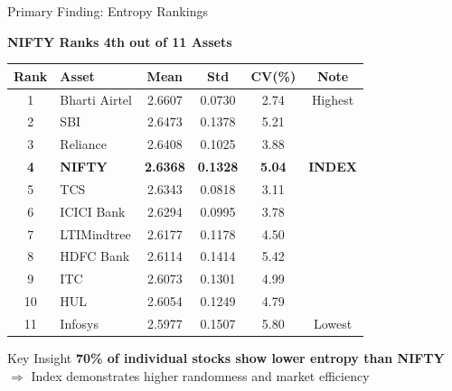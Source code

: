 \documentclass[aspectratio=169,12pt,xcolor=table]{beamer}
\begin{document}
\begin{frame}{Primary Finding: Entropy Rankings}
\begin{center}
\textbf{\Large NIFTY Ranks 4th out of 11 Assets}
\end{center}

\vspace{0.1cm}
\begin{table}[h]
\centering
\small
\begin{tabular}{clcccc}
\toprule
\textbf{Rank} & \textbf{Asset} & \textbf{Mean} & \textbf{Std} & \textbf{CV(\%)} & \textbf{Note} \\
\midrule
1 & Bharti Airtel & 2.6607 & 0.0730 & 2.74 & Highest \\
2 & SBI & 2.6473 & 0.1378 & 5.21 & \\
3 & Reliance & 2.6408 & 0.1025 & 3.88 & \\
\rowcolor{niftyblue!30} \textbf{4} & \textbf{NIFTY} & \textbf{2.6368} & \textbf{0.1328} & \textbf{5.04} & \textbf{INDEX} \\
5 & TCS & 2.6343 & 0.0818 & 3.11 & \\
6 & ICICI Bank & 2.6294 & 0.0995 & 3.78 & \\
7 & LTIMindtree & 2.6177 & 0.1178 & 4.50 & \\
8 & HDFC Bank & 2.6114 & 0.1414 & 5.42 & \\
9 & ITC & 2.6073 & 0.1301 & 4.99 & \\
10 & HUL & 2.6054 & 0.1249 & 4.79 & \\
11 & Infosys & 2.5977 & 0.1507 & 5.80 & Lowest \\
\bottomrule
\end{tabular}
\end{table}

\begin{block}{Key Insight}
\textcolor{niftyblue}{\textbf{70\% of individual stocks show lower entropy than NIFTY}} \\
$\Rightarrow$ Index demonstrates higher randomness and market efficiency
\end{block}
\end{frame}
\end{document}
